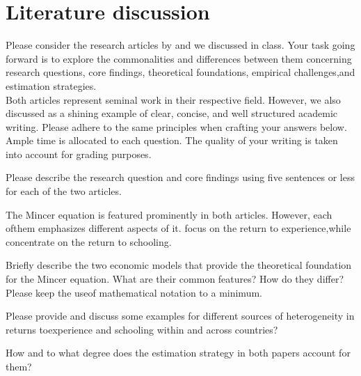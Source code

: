 \section{Literature discussion}
\begin{boenumerate}
\item Please consider the research articles by \citet{Lagakos.2018} and \citet{Carneiro.2011} we discussed in class.  Your task going forward is to explore the commonalities and differences between them concerning research questions, core findings, theoretical foundations, empirical challenges,and estimation strategies. \\

Both articles represent seminal work in their respective field.  However, we also discussed \citet{Lagakos.2018} as a shining example of clear, concise, and well structured academic writing.  Please adhere to the same principles when crafting your answers below.  Ample time is allocated to each question.  The quality of your writing is taken into account for grading purposes.

\begin{boenumerate}
\item  Please describe the research question and core findings using five sentences or less for each of the two articles.
\end{boenumerate}\vspace{0.3cm}

The Mincer equation \citep{Mincer.1974} is featured prominently in both articles.  However, each ofthem emphasizes different aspects of it.  \citet{Lagakos.2018} focus on the return to experience,while \citet{Carneiro.2011} concentrate on the return to schooling.

\begin{boenumerate}
\item Briefly  describe  the  two  economic  models  that  provide  the  theoretical  foundation  for  the Mincer equation.  What are their common features?  How do they differ?  Please keep the useof mathematical notation to a minimum.
\item Please provide and discuss some examples for different sources of heterogeneity in returns toexperience and schooling within and across countries?
\item How and to what degree does the estimation strategy in both papers account for them?
\end{boenumerate}\vspace{0.3cm}


\end{boenumerate}

